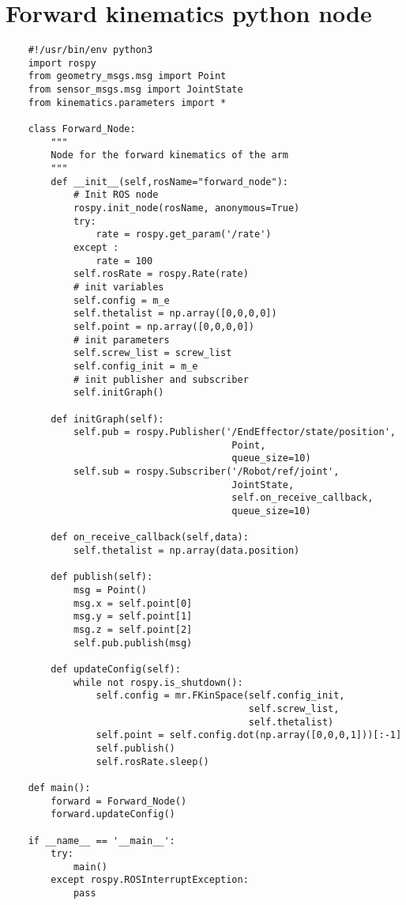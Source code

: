 \section{Forward kinematics python node}
\label{Forward_node}

\begin{verbatim}
    #!/usr/bin/env python3
    import rospy
    from geometry_msgs.msg import Point
    from sensor_msgs.msg import JointState
    from kinematics.parameters import *
    
    class Forward_Node:
        """
        Node for the forward kinematics of the arm
        """
        def __init__(self,rosName="forward_node"):
            # Init ROS node
            rospy.init_node(rosName, anonymous=True)
            try:
                rate = rospy.get_param('/rate')
            except :
                rate = 100
            self.rosRate = rospy.Rate(rate)
            # init variables
            self.config = m_e
            self.thetalist = np.array([0,0,0,0])
            self.point = np.array([0,0,0,0])
            # init parameters 
            self.screw_list = screw_list
            self.config_init = m_e
            # init publisher and subscriber
            self.initGraph()
    
        def initGraph(self):
            self.pub = rospy.Publisher('/EndEffector/state/position',
                                        Point,
                                        queue_size=10)
            self.sub = rospy.Subscriber('/Robot/ref/joint',
                                        JointState,
                                        self.on_receive_callback,
                                        queue_size=10)
    
        def on_receive_callback(self,data):
            self.thetalist = np.array(data.position)
            
        def publish(self):
            msg = Point()
            msg.x = self.point[0]
            msg.y = self.point[1]
            msg.z = self.point[2]
            self.pub.publish(msg)
    
        def updateConfig(self):
            while not rospy.is_shutdown():
                self.config = mr.FKinSpace(self.config_init,
                                           self.screw_list,
                                           self.thetalist)
                self.point = self.config.dot(np.array([0,0,0,1]))[:-1]
                self.publish()
                self.rosRate.sleep()
    
    def main():
        forward = Forward_Node()
        forward.updateConfig()
    
    if __name__ == '__main__':
        try:
            main()
        except rospy.ROSInterruptException:
            pass
\end{verbatim}